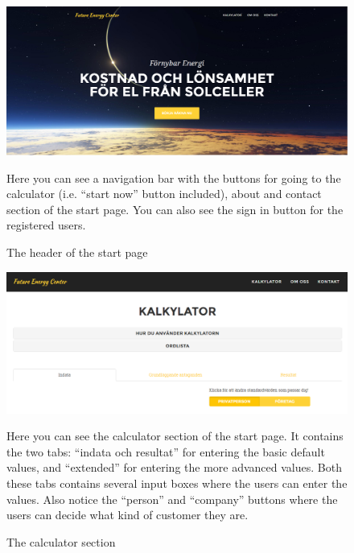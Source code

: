 \documentclass[]{article}
\begin{document}
\begin{figure}[H]
	\centering
	\includegraphics[width=1.0\linewidth]{pic2}
	\caption{The header of the start page}
	\medskip
	\small
	Here you can see a navigation bar with the buttons for going to the calculator (i.e. “start now” button included), about and contact section of the start page. You can also see the sign in button for the registered users.
	\label{fig:pic2}
\end{figure}
\begin{figure}[H]
	\centering
	\includegraphics[width=1.0\linewidth]{pic3}
	\caption{The calculator section}
	\medskip
	\small
	Here you can see the calculator section of the start page. It contains the two tabs: “indata och resultat” for entering the basic default values, and “extended” for entering the more advanced values. Both these tabs contains several input boxes where the users can enter the values. Also notice the “person” and “company” buttons where the users can decide what kind of customer they are. 
	\label{fig:pic3}
\end{figure}
\end{document}
